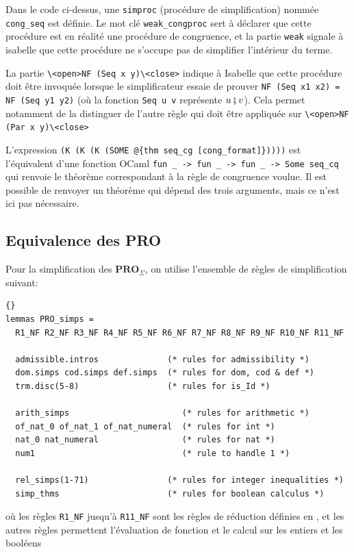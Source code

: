 \documentclass[12pt, a4paper]{article}
\def\pro#1{ \mathbf{PRO}_{ #1 } }
\begin{document}
Dans le code ci-dessus, une \verb|simproc| (procédure de simplification) nommée \verb|cong_seq| est définie. Le mot clé \lstinline[language=Isar]|weak_congproc| sert à déclarer que cette procédure est en réalité une procédure de congruence, et la partie \verb|weak| signale à isabelle que cette procédure ne s'occupe pas de simplifier l'intérieur du terme.

La partie \lstinline[language=Isar]|\<open>NF (Seq x y)\<close>| indique à Isabelle que cette procédure doit être invoquée lorsque le simplificateur essaie de prouver \lstinline[language=Isar]|NF (Seq x1 x2) = NF (Seq y1 y2)| (où  la fonction \lstinline[language=Isar]|Seq u v| représente $u \fatsemi v$). Cela permet notamment de la distinguer de l'autre règle qui doit être appliquée sur \lstinline[language=Isar]|\<open>NF (Par x y)\<close>|

L'expression \verb|(K (K (K (SOME @{thm seq_cg [cong_format]}))))| est l'équivalent d'une fonction OCaml \verb|fun _ -> fun _ -> fun _ -> Some seq_cq| qui renvoie le théorème correspondant à la règle de congruence voulue. Il est possible de renvoyer un théorème qui dépend des trois arguments, mais ce n'est ici pas nécessaire.

\subsection{Equivalence des PRO}

Pour la simplification des $\pro{\Sigma}$, on utilise l'ensemble de règles de simplification suivant:

\begin{lstlisting}[language=Isar]{}
lemmas PRO_simps =
  R1_NF R2_NF R3_NF R4_NF R5_NF R6_NF R7_NF R8_NF R9_NF R10_NF R11_NF

  admissible.intros              (* rules for admissibility *)
  dom.simps cod.simps def.simps  (* rules for dom, cod & def *)
  trm.disc(5-8)                  (* rules for is_Id *)

  arith_simps                       (* rules for arithmetic *)
  of_nat_0 of_nat_1 of_nat_numeral  (* rules for int *)
  nat_0 nat_numeral                 (* rules for nat *)
  num1                              (* rule to handle 1 *)

  rel_simps(1-71)                (* rules for integer inequalities *)
  simp_thms                      (* rules for boolean calculus *)
\end{lstlisting}

où les règles \verb|R1_NF| jusqu'à \verb|R11_NF| sont les règles de réduction définies en \hyperref[fig:pro_rws]{}, et les autres règles permettent l'évaluation de fonction et le calcul sur les entiers et les booléens
\end{document}
